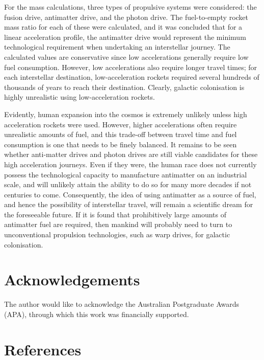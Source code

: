 \documentclass[review]{elsarticle}
\begin{document}
For the mass calculations, three types of propulsive systems were considered: the fusion drive, antimatter drive, and the photon drive. The fuel-to-empty rocket mass ratio for each of these were calculated, and it was concluded that for a linear acceleration profile, the antimatter drive would represent the minimum technological requirement when undertaking an interstellar journey. The calculated values are conservative since low accelerations generally require low fuel consumption. However, low accelerations also require longer travel times; for each interstellar destination, low-acceleration rockets required several hundreds of thousands of years to reach their destination. Clearly, galactic colonisation is highly unrealistic using low-acceleration rockets.

Evidently, human expansion into the cosmos is extremely unlikely unless high acceleration rockets were used. However, higher accelerations often require unrealistic amounts of fuel, and this trade-off between travel time and fuel consumption is one that needs to be finely balanced. It remains to be seen whether anti-matter drives and photon drives are still viable candidates for these high acceleration journeys. Even if they were, the human race does not currently possess the technological capacity to manufacture antimatter on an industrial scale, and will unlikely attain the ability to do so for many more decades if not centuries to come. Consequently, the idea of using antimatter as a source of fuel, and hence the possibility of interstellar travel, will remain a scientific dream for the foreseeable future. If it is found that prohibitively large amounts of antimatter fuel are required, then mankind will probably need to turn to unconventional propulsion technologies, such as warp drives, for galactic colonisation.

\section{Acknowledgements}
The author would like to acknowledge the Australian Postgraduate Awards (APA), through which this work was financially supported.

\section*{References}


\end{document}
